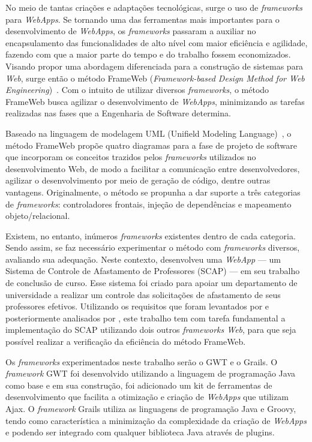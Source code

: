 No meio de tantas criações e adaptações tecnológicas, surge o uso de \textit{frameworks} para \textit{WebApps}. Se tornando uma das ferramentas mais importantes para o desenvolvimento de \textit{WebApps}, os \textit{frameworks} passaram a auxiliar no encapsulamento das funcionalidades de alto nível com maior eficiência e agilidade, fazendo com que a maior parte do tempo e do trabalho fossem economizados. Visando propor uma abordagem diferenciada para a construção de sistemas para \textit{Web}, surge então o método FrameWeb (\textit{Framework-based Design Method for Web Engineering})~\cite{souza:masterthesis07}. Com o intuito de utilizar diversos \textit{frameworks}, o método FrameWeb busca agilizar o desenvolvimento de \textit{WebApps}, minimizando as tarefas realizadas nas fases que a Engenharia de Software determina.

Baseado na linguagem de modelagem UML (Unifield Modeling Language)~\cite{booch-et-al:u06}, o método FrameWeb propõe quatro diagramas para a fase de projeto de software que incorporam os conceitos trazidos pelos \textit{frameworks} utilizados no desenvolvimento Web, de modo a facilitar a comunicação entre desenvolvedores, agilizar o desenvolvimento por meio de geração de código, dentre outras vantagens. Originalmente, o método se propunha a dar suporte a três categorias de \textit{frameworks}: controladores frontais, injeção de dependências e mapeamento objeto/relacional.

Existem, no entanto, inúmeros \textit{frameworks} existentes dentro de cada categoria. Sendo assim, se faz necessário experimentar o método com \textit{frameworks} diversos, avaliando sua adequação. Neste contexto,  desenvolveu uma \textit{WebApp} --- um Sistema de Controle de Afastamento de Professores (SCAP) --- em seu trabalho de conclusão de curso. Esse sistema foi criado para apoiar um departamento de universidade a realizar um controle das solicitações de afastamento de seus professores efetivos. Utilizando os requisitos que foram levantados por  e posteriormente analisados por , este trabalho tem com tarefa fundamental a implementação do SCAP utilizando dois outros \textit{frameworks Web}, para que seja possível realizar a verificação da eficiência do método FrameWeb.

Os \textit{frameworks} experimentados neste trabalho serão o GWT e o Grails. O \textit{framework} GWT foi desenvolvido utilizando a linguagem de programação Java como base e em sua construção, foi adicionado um kit de ferramentas de desenvolvimento que facilita a otimização e criação de \textit{WebApps} que utilizam Ajax. O \textit{framework} Grails utiliza as linguagens de programação Java e Groovy, tendo como característica a minimização da complexidade da criação de \textit{WebApps} e podendo ser integrado com qualquer biblioteca Java através de plugins.